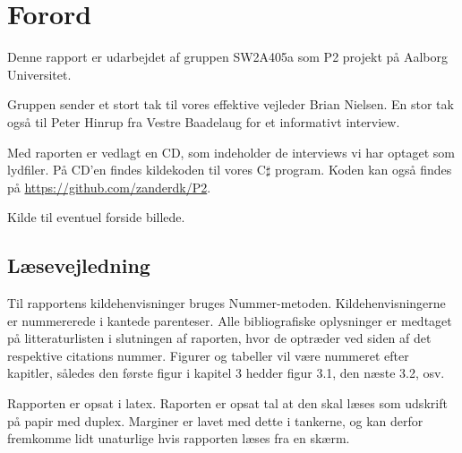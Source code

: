 \chapter*{Forord}
Denne rapport er udarbejdet af gruppen SW2A405a som P2 projekt på Aalborg Universitet.


Gruppen sender et stort tak til vores effektive vejleder Brian Nielsen. En stor tak også til Peter Hinrup fra Vestre Baadelaug for et informativt interview.

Med raporten er vedlagt en CD, som indeholder de interviews vi har optaget som lydfiler. På CD'en findes kildekoden til vores C$\sharp$ program. Koden kan også findes på \url{https://github.com/zanderdk/P2}.

Kilde til eventuel forside billede. %

\section{Læsevejledning}
Til rapportens kildehenvisninger bruges Nummer-metoden. Kildehenvisningerne er nummererede i kantede parenteser. Alle bibliografiske oplysninger er medtaget på litteraturlisten i slutningen af raporten, hvor de optræder ved siden af det respektive citations nummer. Figurer og tabeller vil være nummeret efter kapitler, således den første figur i kapitel 3 hedder figur 3.1, den næste 3.2, osv.

Rapporten er opsat i latex. Raporten er opsat tal at den skal læses som udskrift på papir med duplex. Marginer er lavet med dette i tankerne, og kan derfor fremkomme lidt unaturlige hvis rapporten læses fra en skærm.